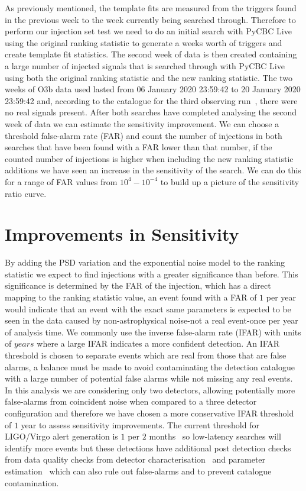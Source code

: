 As previously mentioned, the template fits are measured from the triggers found in the previous week to the week currently being searched through. Therefore to perform our injection set test we need to do an initial search with PyCBC Live using the original ranking statistic to generate a weeks worth of triggers and create template fit statistics. The second week of data is then created containing a large number of injected \gwadj signals that is searched through with PyCBC Live using both the original ranking statistic and the new ranking statistic. The two weeks of O3b \gwadj data used lasted from 06 January 2020 23:59:42 to 20 January 2020 23:59:42 and, according to the \gwadj catalogue for the third observing run~\cite{gwtc3:2023}, there were no real \gwadj signals present. After both searches have completed analysing the second week of data we can estimate the sensitivity improvement. We can choose a threshold false-alarm rate (FAR) and count the number of injections in both searches that have been found with a FAR lower than that number, if the counted number of injections is higher when including the new ranking statistic additions we have seen an increase in the sensitivity of the search. We can do this for a range of FAR values from $10^{4} - 10^{-4}$ to build up a picture of the sensitivity ratio curve.

\section{\label{5:sec:sensitivity-improvements}Improvements in Sensitivity}

By adding the PSD variation and the exponential noise model to the ranking statistic we expect to find \gwadj injections with a greater significance than before. This significance is determined by the FAR of the injection, which has a direct mapping to the ranking statistic value, an event found with a FAR of $1$ per year would indicate that an event with the exact same parameters is expected to be seen in the data caused by non-astrophysical noise-not a real event-once per year of analysis time. We commonly use the inverse false-alarm rate (IFAR) with units of $years$ where a large IFAR indicates a more confident detection. An IFAR threshold is chosen to separate events which are real from those that are false alarms, a balance must be made to avoid contaminating the detection catalogue with a large number of potential false alarms while not missing any real events. In this analysis we are considering only two detectors, allowing potentially more false-alarms from coincident noise when compared to a three detector configuration and therefore we have chosen a more conservative IFAR threshold of $1$ year to assess sensitivity improvements. The current threshold for LIGO/Virgo alert generation is $1$ per $2$ months~\cite{PyCBC_Live:2018} so low-latency \gwadj searches will identify more \gwadj events but these detections have additional post detection checks from data quality checks from detector characterisation~\cite{O2O3_DetChar:2021} and parameter estimation~\cite{gwtc3:2023} which can also rule out false-alarms and to prevent catalogue contamination.

